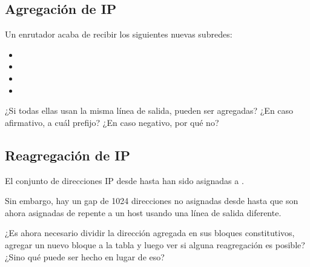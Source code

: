\documentclass[12pt]{report}
\begin{document}
\begin{exer}
\subsection{Agregación de IP \stwo \steo}
Un enrutador acaba de recibir los siguientes nuevas subredes:

\begin{itemize}
\item {}
\item {}
\item {}
\item {}
\end{itemize}

¿Si todas ellas usan la misma línea de salida, pueden ser agregadas? ¿En caso afirmativo, a cuál prefijo? ¿En caso negativo, por qué no?
\end{exer}

\begin{exer}
\subsection{Reagregación de IP \sthree \steo}
El conjunto de direcciones IP desde  hasta  han sido asignadas
a .

Sin embargo, hay un gap de 1024 direcciones no asignadas desde  hasta  que son ahora asignadas de repente a un host usando una línea de salida diferente.

¿Es ahora necesario dividir la dirección agregada en sus bloques constitutivos, agregar un nuevo bloque a la tabla y luego ver si alguna reagregación es posible? ¿Sino qué puede ser hecho en lugar de eso?
\end{exer}
\end{document}
